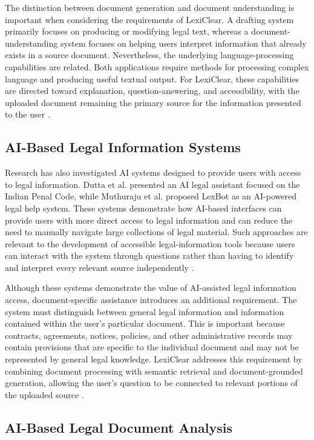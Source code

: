 \documentclass[12pt,a4paper,oneside]{report}
\begin{document}
The distinction between document generation and document understanding is
important when considering the requirements of LexiClear. A drafting system
primarily focuses on producing or modifying legal text, whereas a
document-understanding system focuses on helping users interpret information
that already exists in a source document. Nevertheless, the underlying
language-processing capabilities are related. Both applications require
methods for processing complex language and producing useful textual output.
For LexiClear, these capabilities are directed toward explanation,
question-answering, and accessibility, with the uploaded document remaining
the primary source for the information presented to the user
\cite{pramanik2025,basha2024}.

\subsection{AI-Based Legal Information Systems}

Research has also investigated AI systems designed to provide users with
access to legal information. Dutta et al. presented an AI legal assistant
focused on the Indian Penal Code, while Muthuraju et al. proposed LexBot as
an AI-powered legal help system. These systems demonstrate how AI-based
interfaces can provide users with more direct access to legal information
and can reduce the need to manually navigate large collections of legal
material. Such approaches are relevant to the development of accessible
legal-information tools because users can interact with the system through
questions rather than having to identify and interpret every relevant source
independently
\cite{dutta2024,muthuraju2025}.

Although these systems demonstrate the value of AI-assisted legal information
access, document-specific assistance introduces an additional requirement.
The system must distinguish between general legal information and information
contained within the user's particular document. This is important because
contracts, agreements, notices, policies, and other administrative records
may contain provisions that are specific to the individual document and may
not be represented by general legal knowledge. LexiClear addresses this
requirement by combining document processing with semantic retrieval and
document-grounded generation, allowing the user's question to be connected
to relevant portions of the uploaded source
\cite{dutta2024,muthuraju2025,jurisai2025}.

\subsection{AI-Based Legal Document Analysis}
\end{document}
